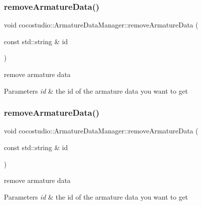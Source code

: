 \subsubsection{\texorpdfstring{remove\+Armature\+Data()}{removeArmatureData()}\hspace{0.1cm}{\footnotesize\ttfamily [1/2]}}
{\footnotesize\ttfamily void cocostudio\+::\+Armature\+Data\+Manager\+::remove\+Armature\+Data (\begin{DoxyParamCaption}\item[{const std\+::string \&}]{id }\end{DoxyParamCaption})}



remove armature data 


\begin{DoxyParams}{Parameters}
{\em id} & the id of the armature data you want to get \\
\hline
\end{DoxyParams}
\mbox{\label{classcocostudio_1_1ArmatureDataManager_ab749f66043b0dd603720ff8c31f2a3b6}} 
\subsubsection{\texorpdfstring{remove\+Armature\+Data()}{removeArmatureData()}\hspace{0.1cm}{\footnotesize\ttfamily [2/2]}}
{\footnotesize\ttfamily void cocostudio\+::\+Armature\+Data\+Manager\+::remove\+Armature\+Data (\begin{DoxyParamCaption}\item[{const std\+::string \&}]{id }\end{DoxyParamCaption})}



remove armature data 


\begin{DoxyParams}{Parameters}
{\em id} & the id of the armature data you want to get \\
\hline
\end{DoxyParams}
\mbox{\label{classcocostudio_1_1ArmatureDataManager_a53b3ec6a3d2264b4321be60b0cdeefc1}} 
